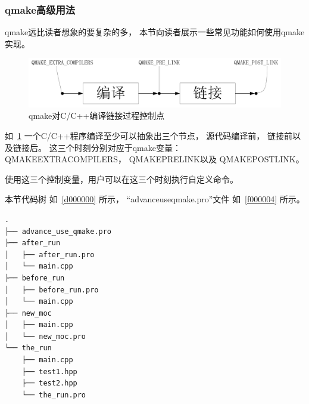
\subsubsection{
qmake高级用法
}\label{ss000810}


qmake远比读者想象的要复杂的多，
本节向读者展示一些常见功能如何使用qmake实现。


\begin{figure}[ht] %
\centering %
\includegraphics[width=\textwidth]{chapter01/images/advance_use_qmake.png} %
\caption{qmake对C/C{\sourcefonttwo{}+}{\sourcefonttwo{}+}编译链接过程控制点} %
\label{p000002} %
\end{figure}


如\figurename\ \ref{p000002}
一个C/C{\sourcefonttwo{}+}{\sourcefonttwo{}+}程序编译至少可以抽象出三个节点，
源代码编译前，
链接前以及链接后。
这三个时刻分别对应于qmake变量：
QMAKE\underline{\hspace{0.5em}}EXTRA\underline{\hspace{0.5em}}COMPILERS，
QMAKE\underline{\hspace{0.5em}}PRE\underline{\hspace{0.5em}}LINK以及
QMAKE\underline{\hspace{0.5em}}POST\underline{\hspace{0.5em}}LINK。

使用这三个控制变量，用户可以在这三个时刻执行自定义命令。

本节代码树
如\treeindexnumbernameone\ \ref{d000000}
所示，
“advance\underline{\hspace{0.5em}}use\underline{\hspace{0.5em}}qmake.pro”文件
如\lstlistingname\ \ref{f000004}
所示。

\label{d000000}    %
\begin{lstlisting}[caption=GoodLuck,
numbers=none,
title=\treeindexnumbernameone \thetreeindexnumber
]
.
├── advance_use_qmake.pro
├── after_run
│   ├── after_run.pro
│   └── main.cpp
├── before_run
│   ├── before_run.pro
│   └── main.cpp
├── new_moc
│   ├── main.cpp
│   └── new_moc.pro
└── the_run
    ├── main.cpp
    ├── test1.hpp
    ├── test2.hpp
    └── the_run.pro
\end{lstlisting}          %

